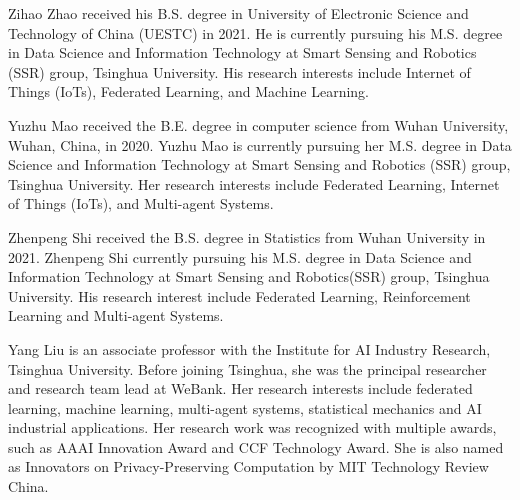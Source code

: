 \documentclass[lettersize,journal]{IEEEtran}
\begin{document}
\begin{IEEEbiography}
 {Zihao Zhao}
 received his B.S. degree in University of Electronic Science and Technology of China (UESTC) in 2021. He is currently pursuing his M.S. degree in Data Science and Information Technology at Smart Sensing and Robotics (SSR) group, Tsinghua University. His research interests include Internet of Things (IoTs), Federated Learning, and Machine Learning. 
\end{IEEEbiography}
\vspace{-20pt}
\begin{IEEEbiography}
{Yuzhu Mao} received the B.E. degree in computer science from Wuhan University, Wuhan, China, in 2020. Yuzhu Mao is currently pursuing her M.S. degree in Data Science and Information Technology at Smart Sensing and Robotics (SSR) group, Tsinghua University. Her research interests include Federated Learning, Internet of Things (IoTs), and Multi-agent Systems. 
\end{IEEEbiography}
\vspace{-20pt}
\begin{IEEEbiography}
 {Zhenpeng Shi}
received the B.S. degree in Statistics from Wuhan University in 2021. Zhenpeng Shi currently pursuing his M.S. degree in Data Science and Information Technology at Smart Sensing and Robotics(SSR) group, Tsinghua University. His research interest include Federated Learning, Reinforcement Learning and Multi-agent Systems.
\end{IEEEbiography}
\vspace{-20pt}
\begin{IEEEbiography}
 {Yang Liu}
is an associate professor with the Institute for AI Industry Research, Tsinghua University. Before joining Tsinghua, she was the principal researcher and research team lead at WeBank. Her research interests include federated learning, machine learning, multi-agent systems, statistical mechanics and AI industrial applications. Her research work was recognized with multiple awards, such as AAAI Innovation Award and CCF Technology Award. She is also named as Innovators on Privacy-Preserving Computation by MIT Technology Review China.
\end{IEEEbiography}
\end{document}
